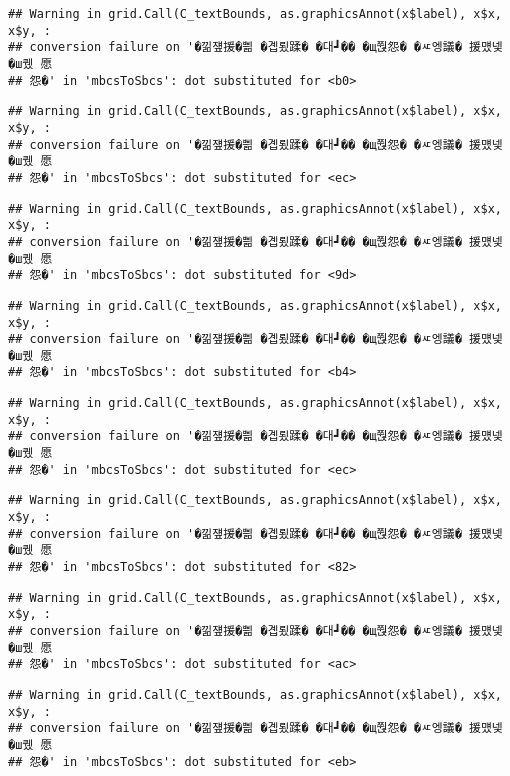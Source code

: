 \documentclass[
]{article}
\begin{document}
\begin{verbatim}
## Warning in grid.Call(C_textBounds, as.graphicsAnnot(x$label), x$x, x$y, :
## conversion failure on '�낆쟾援�쁾 �곕룄蹂� �대┛�� �щ쭩怨� �ㅼ엥議� 援먰넻�ш퀬 愿
## 怨�' in 'mbcsToSbcs': dot substituted for <b0>
\end{verbatim}

\begin{verbatim}
## Warning in grid.Call(C_textBounds, as.graphicsAnnot(x$label), x$x, x$y, :
## conversion failure on '�낆쟾援�쁾 �곕룄蹂� �대┛�� �щ쭩怨� �ㅼ엥議� 援먰넻�ш퀬 愿
## 怨�' in 'mbcsToSbcs': dot substituted for <ec>
\end{verbatim}

\begin{verbatim}
## Warning in grid.Call(C_textBounds, as.graphicsAnnot(x$label), x$x, x$y, :
## conversion failure on '�낆쟾援�쁾 �곕룄蹂� �대┛�� �щ쭩怨� �ㅼ엥議� 援먰넻�ш퀬 愿
## 怨�' in 'mbcsToSbcs': dot substituted for <9d>
\end{verbatim}

\begin{verbatim}
## Warning in grid.Call(C_textBounds, as.graphicsAnnot(x$label), x$x, x$y, :
## conversion failure on '�낆쟾援�쁾 �곕룄蹂� �대┛�� �щ쭩怨� �ㅼ엥議� 援먰넻�ш퀬 愿
## 怨�' in 'mbcsToSbcs': dot substituted for <b4>
\end{verbatim}

\begin{verbatim}
## Warning in grid.Call(C_textBounds, as.graphicsAnnot(x$label), x$x, x$y, :
## conversion failure on '�낆쟾援�쁾 �곕룄蹂� �대┛�� �щ쭩怨� �ㅼ엥議� 援먰넻�ш퀬 愿
## 怨�' in 'mbcsToSbcs': dot substituted for <ec>
\end{verbatim}

\begin{verbatim}
## Warning in grid.Call(C_textBounds, as.graphicsAnnot(x$label), x$x, x$y, :
## conversion failure on '�낆쟾援�쁾 �곕룄蹂� �대┛�� �щ쭩怨� �ㅼ엥議� 援먰넻�ш퀬 愿
## 怨�' in 'mbcsToSbcs': dot substituted for <82>
\end{verbatim}

\begin{verbatim}
## Warning in grid.Call(C_textBounds, as.graphicsAnnot(x$label), x$x, x$y, :
## conversion failure on '�낆쟾援�쁾 �곕룄蹂� �대┛�� �щ쭩怨� �ㅼ엥議� 援먰넻�ш퀬 愿
## 怨�' in 'mbcsToSbcs': dot substituted for <ac>
\end{verbatim}

\begin{verbatim}
## Warning in grid.Call(C_textBounds, as.graphicsAnnot(x$label), x$x, x$y, :
## conversion failure on '�낆쟾援�쁾 �곕룄蹂� �대┛�� �щ쭩怨� �ㅼ엥議� 援먰넻�ш퀬 愿
## 怨�' in 'mbcsToSbcs': dot substituted for <eb>
\end{verbatim}
\end{document}

